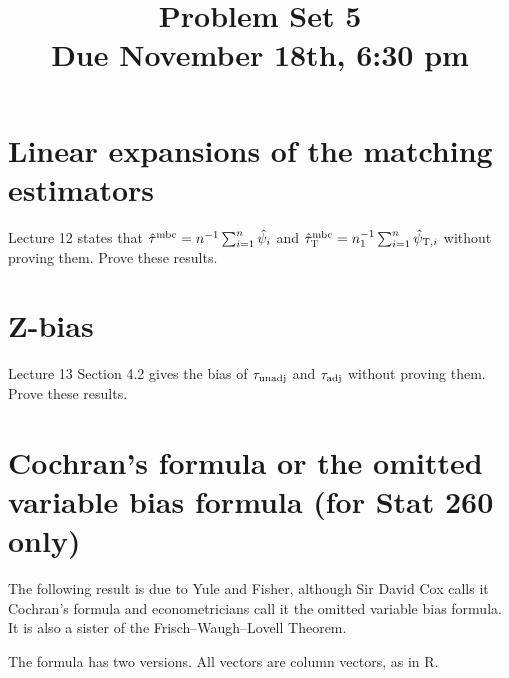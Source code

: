 \documentclass[11pt]{article}
\theoremstyle{definition}
\def\sumn{\sum_{i=1}^n}
\begin{document}
\doublespacing
\title{\bf  Problem Set 5\\
Due November 18th, 6:30 pm
}
\date{}
\maketitle


 
\section{Linear expansions of the matching estimators}
Lecture 12 states that $\hat{\tau}^\textup{mbc}  
= n^{-1} \sumn \hat{\psi}_i$ and $\hat{\tau}_\textsc{T}^\textup{mbc}  =   n_1^{-1} \sumn \hat{\psi}_{\textsc{T}, i}$ without proving them. Prove these results. 


\section{Z-bias}
 Lecture 13 Section 4.2 gives the bias of $\tau_{\textup{unadj}}$ and $\tau_{\textup{adj}}$ without proving them. Prove these results. 


\section{Cochran's formula or the omitted variable bias formula (for Stat 260 only)}

The following result is due to Yule and Fisher, although Sir David Cox calls it Cochran's formula and econometricians call it the omitted variable bias formula. It is also a sister of the Frisch--Waugh--Lovell Theorem.  

The formula has two versions. All vectors are column vectors, as in R. 
\end{document}
